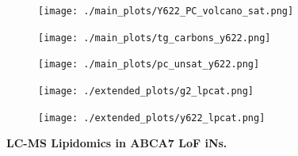 \documentclass[12pt]{article}
\begin{document}
\begin{figure}[H]
    \begin{subfigure}[t]{.3\textwidth}
        \caption{}
        \texttt{[image: ./main\_plots/Y622\_PC\_volcano\_sat.png]}        
    \end{subfigure} 
    \begin{subfigure}[t]{.3\textwidth}
        \caption{}
        \texttt{[image: ./main\_plots/tg\_carbons\_y622.png]}        
    \end{subfigure} 
    \begin{subfigure}[t]{.3\textwidth}
        \caption{}
        \texttt{[image: ./main\_plots/pc\_unsat\_y622.png]}        
    \end{subfigure} 
    \begin{subfigure}[t]{.2\textwidth}
        \caption{}
        \texttt{[image: ./extended\_plots/g2\_lpcat.png]}        
    \end{subfigure} 
    \begin{subfigure}[t]{.2\textwidth}
        \caption{}
        \texttt{[image: ./extended\_plots/y622\_lpcat.png]}        
    \end{subfigure} 
    \caption{
        \textbf{LC-MS Lipidomics in ABCA7 LoF iNs.}\\
    }
    \label{fig:main_lipids}
\end{figure}
\end{document}
